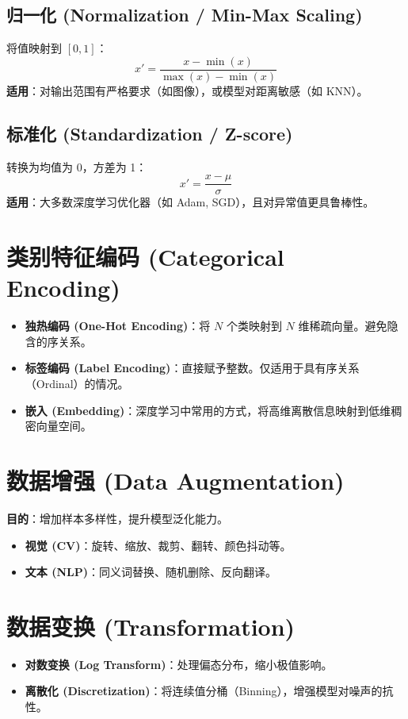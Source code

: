 \documentclass[12pt, a4paper]{article}
\begin{document}
\subsection{归一化 (Normalization / Min-Max Scaling)}
将值映射到 $[0, 1]$：
$$ x' = \frac{x - \min(x)}{\max(x) - \min(x)} $$
\textbf{适用}：对输出范围有严格要求（如图像），或模型对距离敏感（如 KNN）。

\subsection{标准化 (Standardization / Z-score)}
转换为均值为 0，方差为 1：
$$ x' = \frac{x - \mu}{\sigma} $$
\textbf{适用}：大多数深度学习优化器（如 Adam, SGD），且对异常值更具鲁棒性。

\section{类别特征编码 (Categorical Encoding)}

\begin{itemize}
    \item \textbf{独热编码 (One-Hot Encoding)}：将 $N$ 个类映射到 $N$ 维稀疏向量。避免隐含的序关系。
    \item \textbf{标签编码 (Label Encoding)}：直接赋予整数。仅适用于具有序关系（Ordinal）的情况。
    \item \textbf{嵌入 (Embedding)}：深度学习中常用的方式，将高维离散信息映射到低维稠密向量空间。
\end{itemize}

\section{数据增强 (Data Augmentation)}
\textbf{目的}：增加样本多样性，提升模型泛化能力。
\begin{itemize}
    \item \textbf{视觉 (CV)}：旋转、缩放、裁剪、翻转、颜色抖动等。
    \item \textbf{文本 (NLP)}：同义词替换、随机删除、反向翻译。
\end{itemize}

\section{数据变换 (Transformation)}
\begin{itemize}
    \item \textbf{对数变换 (Log Transform)}：处理偏态分布，缩小极值影响。
    \item \textbf{离散化 (Discretization)}：将连续值分桶（Binning），增强模型对噪声的抗性。
\end{itemize}
\end{document}
